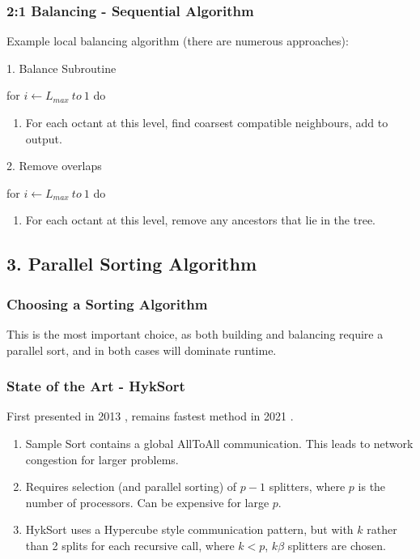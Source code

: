 \begin{frame}
    \frametitle{2:1 Balancing - Sequential Algorithm}

    Example local balancing algorithm (there are numerous approaches):


    1. Balance Subroutine

    for $i \leftarrow L_{max} \> to \>  1$ do
    \begin{enumerate}
        \item For each octant at this level, find coarsest compatible neighbours, add to output.
    \end{enumerate}

    2. Remove overlaps

    for $i \leftarrow L_{max} \> to \>  1$ do
    \begin{enumerate}
        \item For each octant at this level, remove any ancestors that lie in the tree.
    \end{enumerate}

\end{frame}

\subsection{3. Parallel Sorting Algorithm}

\begin{frame}
    \frametitle{Choosing a Sorting Algorithm}
    This is the most important choice, as both building and balancing require a parallel sort, and in both cases will dominate runtime.
\end{frame}

\begin{frame}
    \frametitle{State of the Art - HykSort}
    First presented in 2013 \cite{Sundar2013}, remains fastest method in 2021 \cite{Suh2020}.

    \begin{enumerate}
        \item Sample Sort contains a global AllToAll communication. This leads to network congestion for larger problems.
        \item Requires selection (and parallel sorting) of $p-1$ splitters, where $p$ is the number of processors. Can be expensive for large $p$.
        \item HykSort uses a Hypercube style communication pattern, but with $k$ rather than 2 splits for each recursive call, where $k < p$, $k\beta$ splitters are chosen.
    \end{enumerate}
\end{frame}

